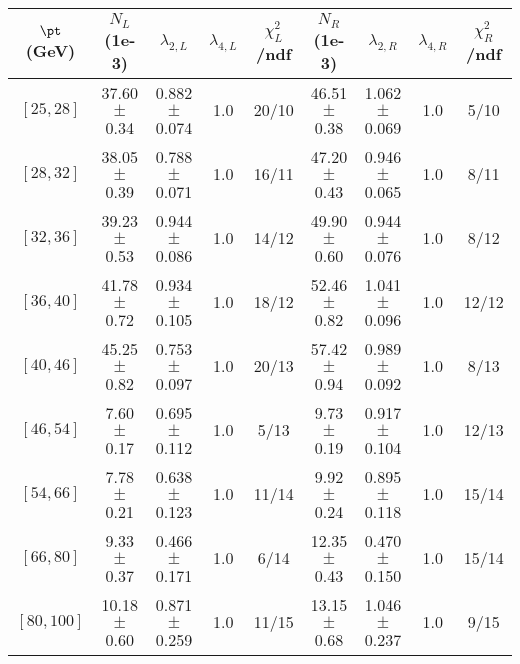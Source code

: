 \begin{tabular}{c||c|c|c|c||c|c|c|c}
$\pt$ (GeV) & $N_L$ (1e-3) & $\lambda_{2,L}$ & $\lambda_{4,L}$  & $\chi^2_L$/ndf & $N_R$ (1e-3) & $\lambda_{2,R}$ & $\lambda_{4,R}$  & $\chi^2_R$/ndf \\
\hline
$[25, 28]$ & 37.60$\pm$0.34 & 0.882$\pm$0.074 & 1.0 & 20/10 & 46.51$\pm$0.38 & 1.062$\pm$0.069 & 1.0 & 5/10\\
$[28, 32]$ & 38.05$\pm$0.39 & 0.788$\pm$0.071 & 1.0 & 16/11 & 47.20$\pm$0.43 & 0.946$\pm$0.065 & 1.0 & 8/11\\
$[32, 36]$ & 39.23$\pm$0.53 & 0.944$\pm$0.086 & 1.0 & 14/12 & 49.90$\pm$0.60 & 0.944$\pm$0.076 & 1.0 & 8/12\\
$[36, 40]$ & 41.78$\pm$0.72 & 0.934$\pm$0.105 & 1.0 & 18/12 & 52.46$\pm$0.82 & 1.041$\pm$0.096 & 1.0 & 12/12\\
$[40, 46]$ & 45.25$\pm$0.82 & 0.753$\pm$0.097 & 1.0 & 20/13 & 57.42$\pm$0.94 & 0.989$\pm$0.092 & 1.0 & 8/13\\
$[46, 54]$ & 7.60$\pm$0.17 & 0.695$\pm$0.112 & 1.0 & 5/13 & 9.73$\pm$0.19 & 0.917$\pm$0.104 & 1.0 & 12/13\\
$[54, 66]$ & 7.78$\pm$0.21 & 0.638$\pm$0.123 & 1.0 & 11/14 & 9.92$\pm$0.24 & 0.895$\pm$0.118 & 1.0 & 15/14\\
$[66, 80]$ & 9.33$\pm$0.37 & 0.466$\pm$0.171 & 1.0 & 6/14 & 12.35$\pm$0.43 & 0.470$\pm$0.150 & 1.0 & 15/14\\
$[80, 100]$ & 10.18$\pm$0.60 & 0.871$\pm$0.259 & 1.0 & 11/15 & 13.15$\pm$0.68 & 1.046$\pm$0.237 & 1.0 & 9/15\\
\end{tabular}
